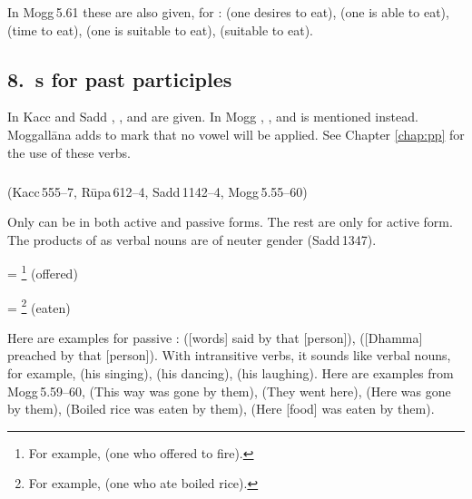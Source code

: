 In Mogg\,5.61 these are also given, for :  (one desires to eat),  (one is able to eat),  (time to eat),  (one is suitable to eat),  (suitable to eat).

\subsection*{8.\ s for past participles}\label{kita:group8}

In Kacc and Sadd , , and  are given. In Mogg , , and  is mentioned instead. Moggall\=ana adds  to mark that no vowel  will be applied. See Chapter \ref{chap:pp} for the use of these verbs.

\subparagraph*{} (Kacc\,555--7, R\=upa\,612--4, Sadd\,1142--4, Mogg\,5.55--60)\label{pacck8:ta}\label{pacck8:kta}\label{pacck8:tavantu}\label{pacck8:ktavantu}\label{pacck8:taavii}\label{pacck8:ktaavii}

Only  can be in both active and passive forms. The rest are only for active form. The products of  as verbal nouns are of neuter gender (Sadd\,1347).

 = \footnote{For example,  (one who offered to fire).} (offered)\par
{} = \footnote{For example,  (one who ate boiled rice).} (eaten)\par

Here are examples for passive :  ([words] said by that [person]),  ([Dhamma] preached by that [person]). With intransitive verbs, it sounds like verbal nouns, for example,  (his singing),  (his dancing),  (his laughing). Here are examples from Mogg\,5.59--60,  (This way was gone by them),  (They went here),  (Here was gone by them),  (Boiled rice was eaten by them),  (Here [food] was eaten by them).

